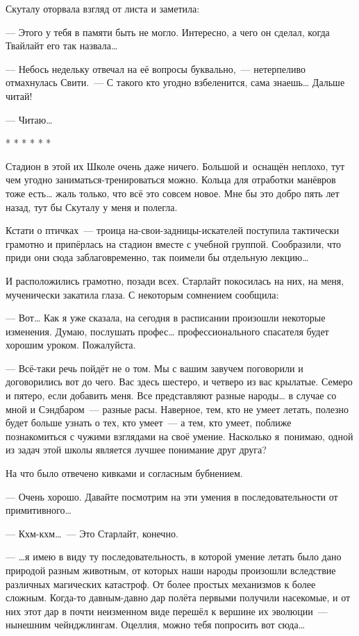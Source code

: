 \documentclass[fontsize=11pt,a5paper,titlepage=firstcover]{scrbook}
\begin{document}
Скуталу оторвала взгляд от листа и заметила:

--- Этого у тебя в памяти быть не могло. Интересно, а чего он сделал, когда Твайлайт его так назвала{\ldots}

--- Небось недельку отвечал на её вопросы буквально,~--- нетерпеливо отмахнулась Свити.~--- С такого кто угодно взбеленится, сама знаешь{\ldots} Дальше читай!

--- Читаю{\ldots}
\begin{center}
	* * * * * *
\end{center}

Стадион в этой их Школе очень даже ничего. Большой и~оснащён неплохо, тут чем угодно заниматься-тренироваться можно. Кольца для отработки манёвров тоже есть{\ldots} жаль только, что всё это совсем новое. Мне бы это добро пять лет назад, тут бы Скуталу у меня и полегла.

Кстати о птичках~--- троица на-свои-задницы-искателей поступила тактически грамотно и припёрлась на стадион вместе с учебной группой. Сообразили, что приди они сюда заблаговременно, так поимели бы отдельную лекцию{\ldots}

И расположились грамотно, позади всех. Старлайт покосилась на них, на меня, мученически закатила глаза. С некоторым сомнением сообщила:

--- Вот{\ldots} Как я уже сказала, на сегодня в расписании произошли некоторые изменения. Думаю, послушать профес{\ldots} профессионального спасателя будет хорошим уроком. Пожалуйста.

--- Всё-таки речь пойдёт не о том. Мы с вашим завучем поговорили и договорились вот до чего. Вас здесь шестеро, и четверо из вас крылатые. Семеро и пятеро, если добавить меня. Все представляют разные народы{\ldots} в случае со мной и Сэндбаром~--- разные расы. Наверное, тем, кто не умеет летать, полезно будет больше узнать о тех, кто умеет~--- а тем, кто умеет, поближе познакомиться с чужими взглядами на своё умение. Насколько я~понимаю, одной из задач этой школы является лучшее понимание друг друга?

На что было отвечено кивками и согласным бубнением.

--- Очень хорошо. Давайте посмотрим на эти умения в последовательности от примитивного{\ldots}

--- Кхм-кхм{\ldots}~--- Это Старлайт, конечно.

--- {\ldots}я имею в виду ту последовательность, в которой умение летать было дано природой разным животным, от которых наши народы произошли вследствие различных магических катастроф. От более простых механизмов к более сложным. Когда-то давным-давно дар полёта первыми получили насекомые, и от них этот дар в почти неизменном виде перешёл к вершине их эволюции~--- нынешним чейнджлингам. Оцеллия, можно тебя попросить вот сюда{\ldots}
\end{document}
